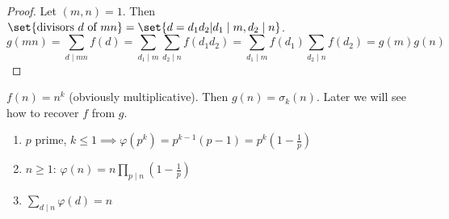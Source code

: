 \documentclass{article}
\begin{document}
\begin{proof}
    Let $(m, n) = 1$.
    Then $\set{ \text{divisors } d \text{ of } mn } = \set{ d = d_1 d_2 | d_1 \mid m, d_2 \mid n }$.
    \begin{equation*}
        g(mn) = \sum_{d \mid mn} f(d) = \sum_{d_1 \mid m} \sum_{d_2 \mid n} f(d_1 d_2) = \sum_{d_1 \mid m} f(d_1) \sum_{d_2 \mid n} f(d_2) = g(m)g(n)
    \end{equation*}
\end{proof}

\begin{eg}
    $f(n) = n^k$ (obviously multiplicative). Then $g(n) = \sigma_k(n)$.
    Later we will see how to recover $f$ from $g$.
\end{eg}


\begin{nthm}\label{thm:2_5}
    \leavevmode
    \begin{enumerate}[label=(\roman*)]
        \item $p$ prime, $k \leq 1 \implies \varphi(p^k) = p^{k-1} (p-1) = p^k \left(1-\frac{1}{p}\right)$
        \item $n \geq 1$: $\varphi (n) = n \prod_{p \mid n}\left( 1-\frac{1}{p} \right)$
        \item $\sum_{d \mid n} \varphi(d) = n$
    \end{enumerate}
\end{nthm}
\end{document}
